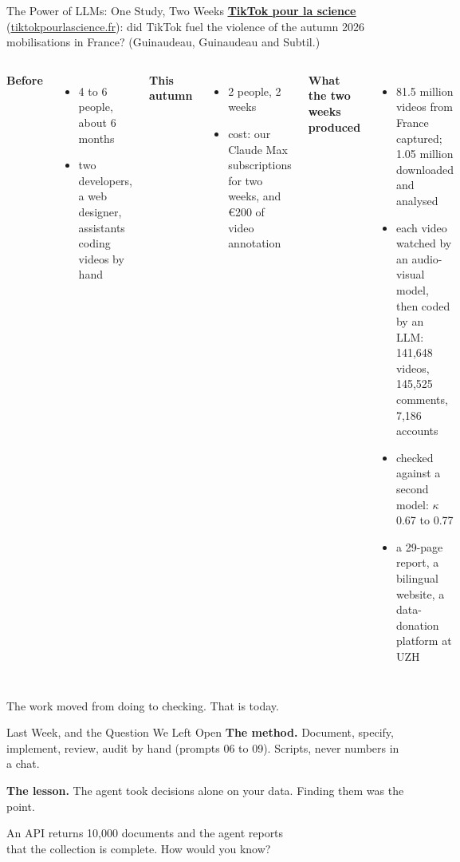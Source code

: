 \documentclass[svgnames,x11names,dvipsnames]{beamer}
\newcommand{\chg}[1]{{\bfseries #1}}
\renewcommand{\chg}[1]{#1}
\begin{document}
\begin{frame}{\chg{The Power of LLMs: One Study, Two Weeks}}
\footnotesize
\textbf{\href{https://tiktokpourlascience.fr}{\textcolor{titleblue}{\underline{TikTok pour la science}}}} {\scriptsize (\href{https://tiktokpourlascience.fr}{\textcolor{titleblue}{tiktokpourlascience.fr}})}: did TikTok fuel the violence of the autumn 2026 mobilisations in France? {\scriptsize (Guinaudeau, Guinaudeau and Subtil.)}

\vspace{0.2cm}
\begin{columns}[T]
\textbf{Before}
\begin{itemize}
    \setlength{\itemsep}{1pt}
    \item 4 to 6 people, about 6 months
    \item two developers, a web designer, assistants coding videos by hand
\end{itemize}
\vspace{0.1cm}
\textbf{This autumn}
\begin{itemize}
    \setlength{\itemsep}{1pt}
    \item 2 people, 2 weeks
    \item cost: our Claude Max subscriptions for two weeks, and \euro{}200 of video annotation
\end{itemize}
\textbf{What the two weeks produced}
\begin{itemize}
    \setlength{\itemsep}{1pt}
    \item 81.5 million videos from France captured; 1.05 million downloaded and analysed
    \item each video watched by an audio-visual model, then coded by an LLM: 141,648 videos, 145,525 comments, 7,186 accounts
    \item checked against a second model: $\kappa$ 0.67 to 0.77
    \item a 29-page report, a bilingual website, a data-donation platform at UZH
\end{itemize}
\end{columns}

\vspace{0.25cm}
\centering
{\small \alert{The work moved from doing to checking. That is today.}}
\end{frame}

\begin{frame}{Last Week, and the Question We Left Open}
\small
\textbf{The method.} Document, specify, implement, review, audit by hand (prompts 06 to 09). Scripts, never numbers in a chat.

\vspace{0.3cm}
\textbf{The lesson.} The agent took decisions alone on your data. Finding them was the point.

\vspace{0.7cm}
\centering
\alert{An API returns 10,000 documents and the agent reports\\ that the collection is complete. How would you know?}
\end{frame}
\end{document}
